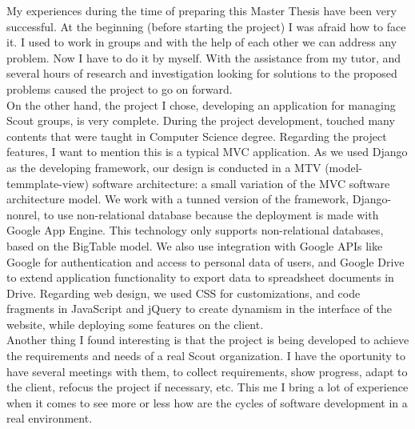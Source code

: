 

My experiences during the time of preparing this Master Thesis have been very successful. At the beginning
(before starting the project) I was afraid how to face it. I used to work in groups and with the help of
each other we can address any problem. Now I have to do it by myself. 
With the assistance from my
tutor, and several hours of research and investigation looking for solutions to the proposed problems caused the project to go on forward.\\

On the other hand, the project I chose, developing an application for managing Scout groups, is very complete.
During the project development,  touched many contents that were taught in Computer Science degree. 
Regarding the project features, I want to mention this is a typical MVC application. As we used Django as the developing  
framework, our design is conducted in a MTV (model-temmplate-view) software architecture: a small variation of the MVC 
software architecture model.
We work with a tunned version of the framework,
Django-nonrel, to use non-relational database because the deployment is made with Google App Engine. This technology
only supports non-relational databases, based on the BigTable model. We also use integration
with Google APIs like Google  for authentication and access to personal data of users, and Google Drive to extend
application functionality to export data to spreadsheet documents in Drive. Regarding web design, we used
CSS for customizations, and code fragments in JavaScript and jQuery to create dynamism in the interface of the website,
while deploying some features on the client.\\

Another thing I found interesting is that the project is being developed to achieve the requirements and needs of a real Scout organization.
I have the oportunity to have several meetings with them, to collect requirements, show progress, adapt to the client,
refocus the project if necessary, etc. This me I bring a lot of experience when it comes to see more or less how are the cycles of
software development in a real environment.\\

